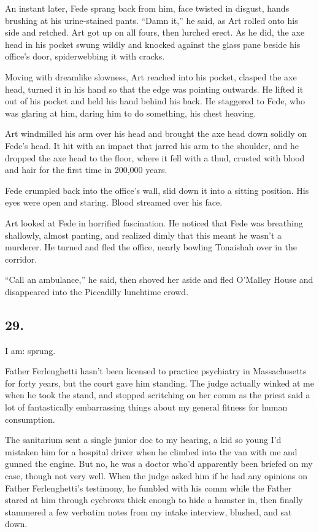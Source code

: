 An instant later, Fede sprang back from him, face twisted in
disgust, hands brushing at his urine-stained pants. “Damn it,” he
said, as Art rolled onto his side and retched. Art got up on all
fours, then lurched erect. As he did, the axe head in his pocket
swung wildly and knocked against the glass pane beside his office’s
door, spiderwebbing it with cracks.

Moving with dreamlike slowness, Art reached into his pocket,
clasped the axe head, turned it in his hand so that the edge was
pointing outwards. He lifted it out of his pocket and held his hand
behind his back. He staggered to Fede, who was glaring at him,
daring him to do something, his chest heaving.

Art windmilled his arm over his head and brought the axe head down
solidly on Fede’s head. It hit with an impact that jarred his arm
to the shoulder, and he dropped the axe head to the floor, where it
fell with a thud, crusted with blood and hair for the first time in
200,000 years.

Fede crumpled back into the office’s wall, slid down it into a
sitting position. His eyes were open and staring. Blood streamed
over his face.

Art looked at Fede in horrified fascination. He noticed that Fede
was breathing shallowly, almost panting, and realized dimly that
this meant he wasn’t a murderer. He turned and fled the office,
nearly bowling Tonaishah over in the corridor.

“Call an ambulance,” he said, then shoved her aside and fled
O’Malley House and disappeared into the Piccadilly lunchtime
crowd.

\subsection{29.}

I am: sprung.

Father Ferlenghetti hasn’t been licensed to practice psychiatry in
Massachusetts for forty years, but the court gave him standing. The
judge actually winked at me when he took the stand, and stopped
scritching on her comm as the priest said a lot of fantastically
embarrassing things about my general fitness for human
consumption.

The sanitarium sent a single junior doc to my hearing, a kid so
young I’d mistaken him for a hospital driver when he climbed into
the van with me and gunned the engine. But no, he was a doctor
who’d apparently been briefed on my case, though not very well.
When the judge asked him if he had any opinions on Father
Ferlenghetti’s testimony, he fumbled with his comm while the Father
stared at him through eyebrows thick enough to hide a hamster in,
then finally stammered a few verbatim notes from my intake
interview, blushed, and sat down.

